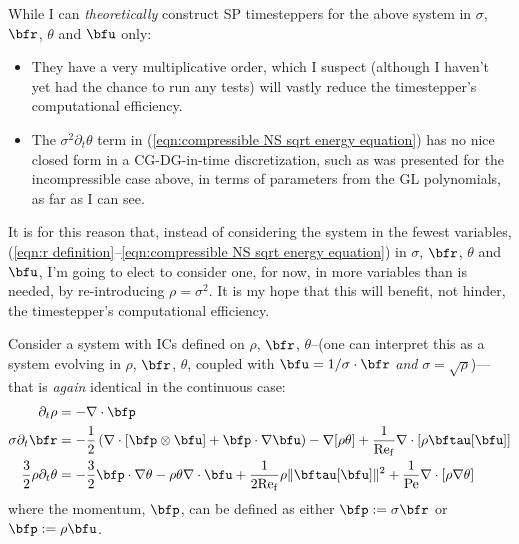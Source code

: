     \begin{remark}
        While I can \emph{theoretically} construct SP timesteppers for the above system in $\sigma$, $\bfr$, $\theta$ and $\bfu$ only:
        \begin{itemize}
            \item  They have a very multiplicative order, which I suspect (although I haven't yet had the chance to run any tests) will vastly reduce the timestepper's computational efficiency.
            \item  The $\sigma^{2}\partial_{t}\theta$ term in (\ref{eqn:compressible NS sqrt energy equation}) has no nice closed form in a CG-DG-in-time discretization, such as was presented for the incompressible case above, in terms of parameters from the GL polynomials, as far as I can see.
        \end{itemize}
        It is for this reason that, instead of considering the system in the fewest variables, (\ref{eqn:r definition}--\ref{eqn:compressible NS sqrt energy equation}) in $\sigma$, $\bfr$, $\theta$ and $\bfu$, I'm going to elect to consider one, for now, in more variables than is needed, by re-introducing $\rho = \sigma^{2}$. It is my hope that this will benefit, not hinder, the timestepper's computational efficiency.
    \end{remark}

    Consider a system with ICs defined on $\rho$, $\bfr$, $\theta$--(one can interpret this as a system evolving in $\rho$, $\bfr$, $\theta$, coupled with $\bfu = 1/\sigma\cdot\bfr$ \emph{and} $\sigma = \sqrt{\rho}$)---that is \emph{again} identical in the continuous case:
    \begin{align}
                         \partial_{t}\rho  &=  - \nabla\cdot\bfp  \label{eqn:compressible NS final mass equation}  \\
                   \sigma\partial_{t}\bfr  &=  - \frac{1}{2}\left(\nabla\cdot\left[\bfp\otimes\bfu\right] + \bfp\cdot\nabla\bfu\right) - \nabla[\rho\theta] + \frac{1}{\rmRef}\nabla\cdot\left[\rho\bftau[\bfu]\right]  \\
        \frac{3}{2}\rho\partial_{t}\theta  &=  - \frac{3}{2}\bfp\cdot\nabla\theta - \rho\theta\nabla\cdot\bfu + \frac{1}{2\rmRef}\rho\|\bftau[\bfu]\|^{2} + \frac{1}{\rmPe}\nabla\cdot\left[\rho\nabla\theta\right]  \label{eqn:compressible NS final energy equation}
    \end{align}
    where the momentum, $\bfp$, can be defined as either $\bfp := \sigma\bfr$ or $\bfp := \rho\bfu$.

